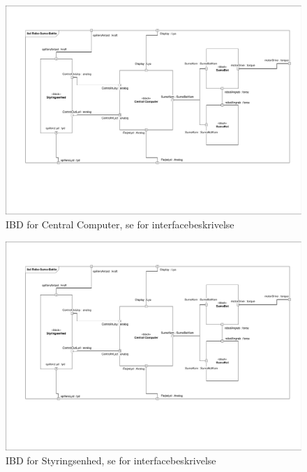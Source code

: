 \begin{figure}[hpt]
	\centering
   	\includegraphics[page=3,width=1\linewidth]{figs/Diagrammer/IBD.pdf}
	\caption{IBD for Central Computer, se  for interfacebeskrivelse}
	\label{fig:IBD_CentralComputer}
\end{figure}
\begin{figure}[hpt]
	\centering
   	\includegraphics[page=2,width=1\linewidth]{figs/Diagrammer/IBD.pdf}
	\caption{IBD for Styringsenhed, se  for interfacebeskrivelse}
	\label{fig:IBD_Styringsenhed}
\end{figure}

